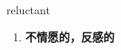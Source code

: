 
\begin{frame}
{\huge reluctant}
\begin{center}
\begin{enumerate}\Large
  \item \textbf{不情愿的，反感的}
\end{enumerate}
\end{center}
\end{frame}
